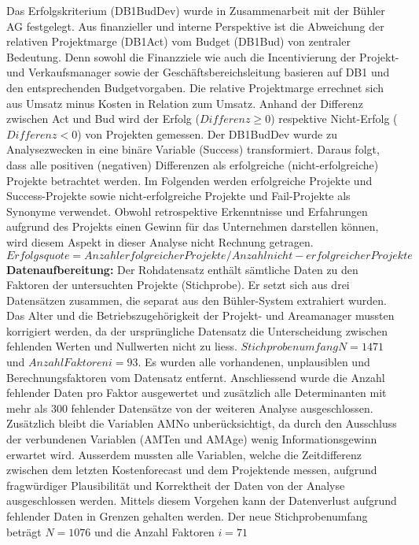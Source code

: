 \newline Das Erfolgskriterium (DB1BudDev) wurde in Zusammenarbeit mit der Bühler AG festgelegt. Aus finanzieller und interne Perspektive ist die Abweichung der relativen Projektmarge (DB1Act) vom Budget (DB1Bud) von zentraler Bedeutung. Denn sowohl die Finanzziele wie auch die Incentivierung der Projekt- und Verkaufsmanager sowie der Geschäftsbereichsleitung basieren auf DB1 und den entsprechenden Budgetvorgaben. Die relative Projektmarge errechnet sich aus Umsatz minus Kosten in Relation zum Umsatz. Anhand der Differenz zwischen Act und Bud wird der Erfolg ($Differenz \geq 0$) respektive Nicht-Erfolg ($Differenz < 0$) von Projekten gemessen. Der DB1BudDev wurde zu Analysezwecken in eine binäre Variable (Success) transformiert. Daraus folgt, dass alle positiven (negativen) Differenzen als erfolgreiche (nicht-erfolgreiche) Projekte betrachtet werden. Im Folgenden werden erfolgreiche Projekte und Success-Projekte sowie nicht-erfolgreiche Projekte und Fail-Projekte als Synonyme verwendet. Obwohl retrospektive Erkenntnisse und Erfahrungen aufgrund des Projekts einen Gewinn für das Unternehmen darstellen können, wird diesem Aspekt in dieser Analyse nicht Rechnung getragen. 
\newline\newline $Erfolgsquote = Anzahl erfolgreicher Projekte/Anzahl nicht-erfolgreicher Projekte$
\newline\newline\textbf{Datenaufbereitung:} Der Rohdatensatz enthält sämtliche Daten zu den Faktoren der untersuchten Projekte (Stichprobe). Er setzt sich aus drei Datensätzen zusammen, die separat aus den Bühler-System extrahiert wurden. Das Alter und die Betriebszugehörigkeit der Projekt- und Areamanager mussten korrigiert werden, da der ursprüngliche Datensatz die Unterscheidung zwischen fehlenden Werten und Nullwerten nicht zu liess.
\newline\newline $Stichprobenumfang N = 1471$ und $Anzahl Faktoren i = 93$.
\newline\newline
Es wurden alle vorhandenen, unplausiblen und Berechnungsfaktoren vom Datensatz entfernt. Anschliessend wurde die Anzahl fehlender Daten pro Faktor ausgewertet und zusätzlich alle Determinanten mit mehr als 300 fehlender Datensätze von der weiteren Analyse ausgeschlossen. Zusätzlich bleibt die Variablen AMNo unberücksichtigt, da durch den Ausschluss der verbundenen Variablen (AMTen und AMAge) wenig Informationsgewinn erwartet wird. Ausserdem mussten alle Variablen, welche die Zeitdifferenz zwischen dem letzten Kostenforecast und dem Projektende messen, aufgrund fragwürdiger Plausibilität und Korrektheit der Daten von der Analyse ausgeschlossen werden. Mittels diesem Vorgehen kann der Datenverlust aufgrund fehlender Daten in Grenzen gehalten werden. Der neue Stichprobenumfang beträgt $N = 1076$ und die Anzahl Faktoren $i = 71$
